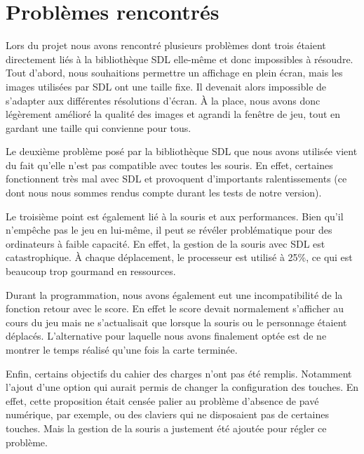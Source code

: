 \documentclass[english,11pt]{report}
\begin{document}
\chapter{Problèmes rencontrés}

Lors du projet nous avons rencontré plusieurs problèmes dont trois \'etaient directement liés à la bibliothèque SDL elle-même et donc impossibles à résoudre. Tout d’abord, nous souhaitions permettre un affichage en plein écran, mais les images utilisées par SDL ont une taille fixe. Il devenait alors impossible de s’adapter aux différentes résolutions d’écran. À la place, nous avons donc légèrement amélioré la qualité des images et agrandi la fenêtre de jeu, tout en gardant une taille qui convienne pour tous.\par
\vspace{0.2cm}
Le deuxième problème posé par la bibliothèque SDL que nous avons utilisée vient du fait qu’elle n’est pas compatible avec toutes les souris. En effet, certaines fonctionnent très mal avec SDL et provoquent d’importants ralentissements (ce dont nous nous sommes rendus compte durant les tests de notre version).\par
\vspace{0.2cm}
Le troisième point est également lié à la souris et aux performances. Bien qu’il n’empêche pas le jeu en lui-même, il peut se révéler problématique pour des ordinateurs à faible capacité. En effet, la gestion de la souris avec SDL est catastrophique. À chaque déplacement, le processeur est utilisé à 25\%, ce qui est beaucoup trop gourmand en ressources.\par
\vspace{0.2cm}
Durant la programmation, nous avons également eut une incompatibilité de la fonction retour avec le score. En effet le score devait normalement s’afficher au cours du jeu mais ne s’actualisait que lorsque la souris ou le personnage étaient déplacés. L’alternative pour laquelle nous avons finalement optée est de ne montrer le temps réalisé qu’une fois la carte terminée.\par
\vspace{1cm}
Enfin, certains objectifs du cahier des charges n’ont pas été remplis. Notamment l’ajout d’une option qui aurait permis de changer la configuration des touches. En effet, cette proposition était censée palier au problème d’absence de pavé numérique, par exemple, ou des claviers qui ne disposaient pas de certaines touches. Mais la gestion de la souris a justement été ajoutée pour régler ce problème.\par
\end{document}
